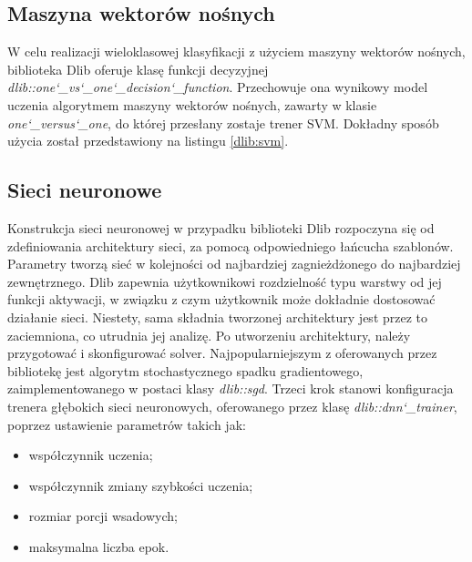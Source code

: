 
\subsection{Maszyna wektorów nośnych}

W celu realizacji wieloklasowej klasyfikacji z użyciem maszyny wektorów nośnych, biblioteka Dlib oferuje klasę funkcji decyzyjnej \textit{dlib::one\char`_vs\char`_one\char`_decision\char`_function}. Przechowuje ona wynikowy model uczenia algorytmem maszyny wektorów nośnych, zawarty w klasie \textit{one\char`_versus\char`_one}, do której przesłany zostaje trener SVM. Dokładny sposób użycia został przedstawiony na listingu \ref{dlib:svm}.


\subsection{Sieci neuronowe}

Konstrukcja sieci neuronowej w przypadku biblioteki Dlib rozpoczyna się od zdefiniowania architektury sieci, za pomocą odpowiedniego łańcucha szablonów. Parametry tworzą sieć w kolejności od najbardziej zagnieżdżonego do najbardziej zewnętrznego. Dlib zapewnia użytkownikowi rozdzielność typu warstwy od jej funkcji aktywacji, w związku z czym użytkownik może dokładnie dostosować działanie sieci. Niestety, sama składnia tworzonej architektury jest przez to zaciemniona, co utrudnia jej analizę. Po utworzeniu architektury, należy przygotować i skonfigurować solver. Najpopularniejszym z oferowanych przez bibliotekę jest algorytm stochastycznego spadku gradientowego, zaimplementowanego w postaci klasy \textit{dlib::sgd}. Trzeci krok stanowi konfiguracja trenera głębokich sieci neuronowych, oferowanego przez klasę \textit{dlib::dnn\char`_trainer}, poprzez ustawienie parametrów takich jak:

\begin{itemize}
	\item współczynnik uczenia;
	\item współczynnik zmiany szybkości uczenia; 
	\item rozmiar porcji wsadowych;
	\item maksymalna liczba epok.
\end{itemize}

